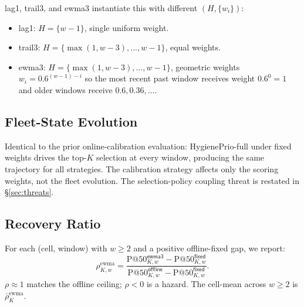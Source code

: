 \textsf{lag1}, \textsf{trail3}, and \textsf{ewma3} instantiate this
with different $(H, \{w_i\})$:

\begin{itemize}
\item \textsf{lag1}: $H = \{w-1\}$, single uniform weight.
\item \textsf{trail3}: $H = \{\max(1, w-3), \ldots, w-1\}$, equal weights.
\item \textsf{ewma3}: $H = \{\max(1, w-3), \ldots, w-1\}$, geometric
weights $w_i = 0.6^{(w-1)-i}$ so the most recent past window receives
weight $0.6^0 = 1$ and older windows receive $0.6, 0.36, \ldots$.
\end{itemize}

\subsection{Fleet-State Evolution}

Identical to the prior online-calibration evaluation: HygienePrio-full under \textsf{fixed} weights
drives the top-$K$ selection at every window, producing the same
trajectory for all strategies. The calibration strategy affects only
the scoring weights, not the fleet evolution. The selection-policy
coupling threat is restated in \S\ref{sec:threats}.

\subsection{Recovery Ratio}

For each (cell, window) with $w \geq 2$ and a positive offline-fixed
gap, we report:
\begin{equation}
\rho_{K, w}^{\text{ewma}} =
\frac{\text{P@50}^{\textsf{ewma3}}_{K, w} - \text{P@50}^{\textsf{fixed}}_{K, w}}
     {\text{P@50}^{\textsf{offline}}_{K, w} - \text{P@50}^{\textsf{fixed}}_{K, w}}.
\end{equation}
$\rho \approx 1$ matches the offline ceiling; $\rho < 0$ is a hazard.
The cell-mean across $w \geq 2$ is $\bar\rho_K^{\text{ewma}}$.
